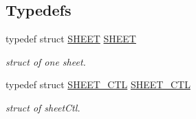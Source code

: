 \subsection*{Typedefs}
\begin{DoxyCompactItemize}
\item 
typedef struct \hyperlink{struct_s_h_e_e_t}{S\+H\+E\+E\+T} \hyperlink{group__sheet_ga23b899e9e9ca793355d135d465a525ec}{S\+H\+E\+E\+T}
\begin{DoxyCompactList}\small\item\em struct of one sheet. \end{DoxyCompactList}\item 
typedef struct \hyperlink{struct_s_h_e_e_t___c_t_l}{S\+H\+E\+E\+T\+\_\+\+C\+T\+L} \hyperlink{group__sheet_ga834357b928338fffff2455b852af235d}{S\+H\+E\+E\+T\+\_\+\+C\+T\+L}
\begin{DoxyCompactList}\small\item\em struct of sheet\+Ctl. \end{DoxyCompactList}\end{DoxyCompactItemize}
